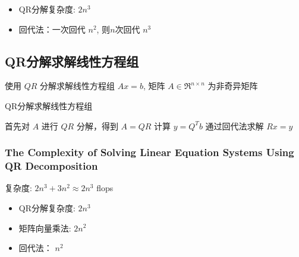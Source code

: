 \begin{itemize}
    \item QR分解复杂度: $ 2 n^{3} $
    \item 回代法：一次回代 $ n^{2} $, 则$n$次回代 $ n^{3} $
\end{itemize}


\subsection{QR分解求解线性方程组}

使用 $ Q R $ 分解求解线性方程组 $ A x=b $, 矩阵 $ A \in \mathfrak{R}^{n \times n} $ 为非奇异矩阵

\begin{algorithm}[htbp]
    \caption{QR分解求解线性方程组}
    首先对 $ A $ 进行 $ Q R $ 分解，得到 $ A=Q R $\;
    计算 $ y=Q^{T} b $\;
    通过回代法求解 $ R x=y $\;
\end{algorithm}


\subsubsection{The Complexity of Solving Linear Equation Systems Using QR Decomposition}
\label{complexity:linear-equation-qr}

复杂度: $ 2 n^{3}+3 n^{2} \approx 2 n^{3} $ flops 

\begin{itemize}
    \item QR分解复杂度: $ 2 n^{3} $
    \item 矩阵向量乘法: $ 2 n^{2} $
    \item 回代法： $ n^{2} $
\end{itemize}
